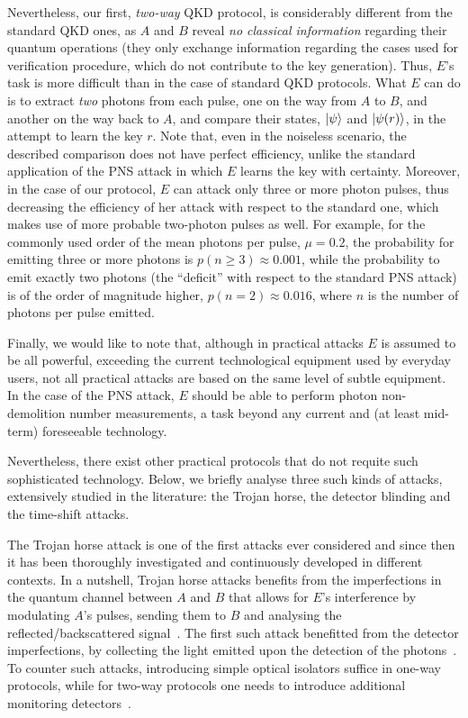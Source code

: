 Nevertheless, our first, {\em two-way} QKD protocol, is considerably different from the standard QKD ones, as $A$ and $B$ reveal {\em no classical information} regarding their quantum operations (they only exchange information regarding the cases used for verification procedure, which do not contribute to the key generation). Thus, $E$'s task is more difficult than in the case of standard QKD protocols. What $E$ can do is to extract {\em two} photons from each pulse, one on the way from $A$ to $B$, and another on the way back to $A$, and compare their states, $| \psi \rangle$ and $| \psi(r) \rangle$, in the attempt to learn the key $r$. Note that, even in the noiseless scenario, the described comparison does not have perfect efficiency, unlike the standard application of the PNS attack in which $E$ learns the key with certainty. Moreover, in the case of our protocol, $E$ can attack only three or more photon pulses, thus decreasing the efficiency of her attack with respect to the standard one, which makes use of more probable two-photon pulses as well. For example, for the commonly used order of the mean photons per pulse, $\mu = 0.2$, the probability for emitting three or more photons is $p(n\geq 3) \approx 0.001$, while the probability to emit exactly two photons (the ``deficit'' with respect to the standard PNS attack) is of the order of magnitude higher, $p(n=2) \approx 0.016$, where $n$ is the number of photons per pulse emitted. 

Finally, we would like to note that, although in practical attacks $E$ is assumed to be all powerful, exceeding the current technological equipment used by everyday users, not all practical attacks are based on the same level of subtle equipment. In the case of the PNS attack, $E$ should be able to perform photon non-demolition number measurements, a task beyond any current and (at least mid-term) foreseeable technology.

Nevertheless, there exist other practical protocols that do not requite such sophisticated technology. Below, we briefly analyse three such kinds of attacks, extensively studied in the literature: the Trojan horse, the detector blinding and the time-shift attacks.

The Trojan horse attack is one of the first attacks ever considered and since then it has been thoroughly investigated and continuously developed in different contexts. In a nutshell, Trojan horse attacks benefits from the imperfections in the quantum channel between $A$ and $B$ that allows for $E$'s interference by modulating $A$'s pulses, sending them to $B$ and analysing the reflected/backscattered signal~\cite{vak:mak:hje:01,luc:cho:war:dyn:yua:shi:15,saj:min:jai:mak:17}. The first such attack benefitted from the detector imperfections, by collecting the light emitted upon the detection of the photons~\cite{kur:zar:may:wei:01}. To counter such attacks, introducing simple optical isolators suffice in one-way protocols, while for two-way protocols one needs to introduce additional monitoring detectors~\cite{gis:fas:kra:zbi:rib:06}.

